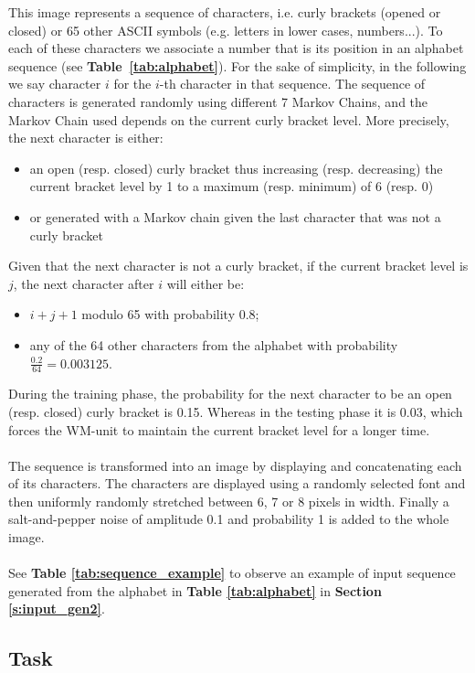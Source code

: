 This image represents a sequence of characters, i.e. curly brackets (opened or closed) or 65 other ASCII symbols (e.g. letters in lower cases, numbers...).
To each of these characters we associate a number that is its position in an alphabet sequence (see \textbf{Table~\ref{tab:alphabet}}).
For the sake of simplicity, in the following we say character $i$ for the $i$-th character in that sequence.
The sequence of characters is generated randomly using different 7 Markov Chains, and the Markov Chain used depends on the current curly bracket level.
More precisely, the next character is either:
\begin{itemize}
    \item an open (resp. closed) curly bracket thus increasing (resp. decreasing) the current bracket level by 1 to a maximum (resp. minimum) of 6 (resp. 0)
    \item or generated with a Markov chain given the last character that was not a curly bracket
\end{itemize}
Given that the next character is not a curly bracket, if the current bracket level is $\mathit{j}$, the next character after $\mathit{i}$ will either be:
\begin{itemize}
    \item $\mathit{i} + \mathit{j} + 1$ modulo 65 with probability $0.8$;
    \item any of the 64 other characters from the alphabet with probability $\frac{0.2}{64} = 0.003125
$.
\end{itemize}
During the training phase, the probability for the next character to be an open (resp. closed) curly bracket is 0.15.
Whereas in the testing phase it is 0.03, which forces the WM-unit to maintain the current bracket level for a longer time. \\
\\
The sequence is transformed into an image by displaying and concatenating each of its characters. 
The characters are displayed using a randomly selected font and then uniformly randomly stretched between 6, 7 or 8 pixels in width.
Finally a salt-and-pepper noise of amplitude 0.1 and probability 1 is added to the whole image.\\
\\
See \textbf{Table \ref{tab:sequence_example}} to observe an example of input sequence generated from the alphabet in \textbf{Table \ref{tab:alphabet}} in \textbf{Section \ref{s:input_gen2}}.

\subsection{Task}

